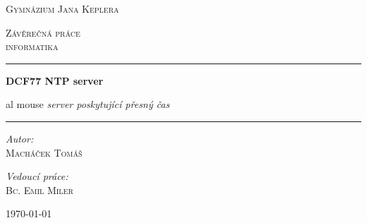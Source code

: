 \begin{titlepage}
    \begin{center}
        \vspace*{.06\textheight}

        \LARGE

        \textsc{Gymnázium Jana Keplera}

        \vspace{1.5cm}

        \Large

        \textsc{Závěrečná práce\\
        informatika}

        \vspace{1.5cm}

        \hrule

        \vspace{0.8cm}

        \LARGE
        \textbf{DCF77 NTP server}

        \vspace{0.2cm}al mouse
        \Large
        \emph{server poskytující přesný čas}

        \vspace{0.8cm}

        \hrule
        \vspace{2cm}

        \begin{minipage}[c]{0.4\textwidth}
            \begin{flushleft} \large
                \emph{Autor:}\\
                \textsc{Macháček Tomáš}
            \end{flushleft}
        \end{minipage}
        \begin{minipage}[c]{0.4\textwidth}
            \begin{flushright} \large
                \emph{Vedoucí práce:} \\
                \textsc{Bc. Emil Miler}
            \end{flushright}
        \end{minipage}

        \vspace{8cm}

        \today

        \vfill

    \end{center}
\end{titlepage}
